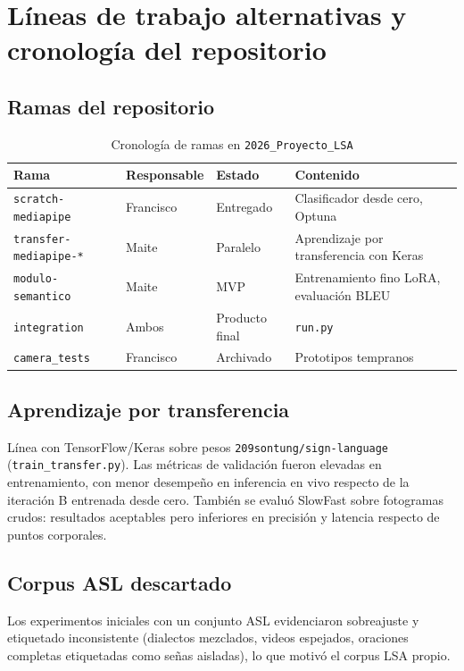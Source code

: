 \documentclass[12pt,a4paper]{report}
\begin{document}
\chapter{Líneas de trabajo alternativas y cronología del repositorio}
\label{anexo:experimentos}

\section{Ramas del repositorio}
\begin{table}[H]
\centering
\caption{Cronología de ramas en \texttt{2026\_Proyecto\_LSA}}
\label{tab:ramas}
\small
\begin{tabular}{@{}lllp{5cm}@{}}
\toprule
\textbf{Rama} & \textbf{Responsable} & \textbf{Estado} & \textbf{Contenido} \\
\midrule
\texttt{scratch-mediapipe} & Francisco & Entregado & Clasificador desde cero, Optuna \\
\texttt{transfer-mediapipe-*} & Maite & Paralelo & Aprendizaje por transferencia con Keras \\
\texttt{modulo-semantico} & Maite & MVP & Entrenamiento fino LoRA, evaluación BLEU \\
\texttt{integration} & Ambos & Producto final & \texttt{run.py} \\
\texttt{camera\_tests} & Francisco & Archivado & Prototipos tempranos \\
\bottomrule
\end{tabular}
\end{table}

\section{Aprendizaje por transferencia}
Línea con TensorFlow/Keras sobre pesos \texttt{209sontung/sign-language} (\texttt{train\_transfer.py}). Las métricas de validación fueron elevadas en entrenamiento, con menor desempeño en inferencia en vivo respecto de la iteración B entrenada desde cero. También se evaluó SlowFast sobre fotogramas crudos: resultados aceptables pero inferiores en precisión y latencia respecto de puntos corporales.

\section{Corpus ASL descartado}
Los experimentos iniciales con un conjunto ASL evidenciaron sobreajuste y etiquetado inconsistente (dialectos mezclados, videos espejados, oraciones completas etiquetadas como señas aisladas), lo que motivó el corpus LSA propio.
\end{document}
